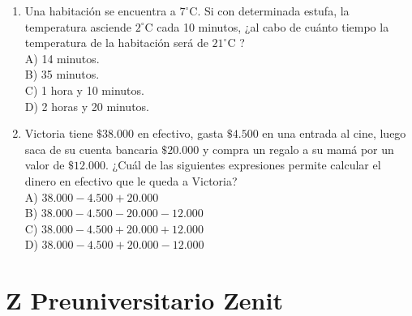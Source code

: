 \documentclass[10pt]{article}
\begin{document}
\begin{enumerate}
B) $10 \mathrm{hr} \cdot 21 \mathrm{~min} \cdot 36 \mathrm{seg}$\\
C) $10 \mathrm{hr} \cdot 21 \mathrm{~min} \cdot 42 \mathrm{seg}$\\
D) $10 \mathrm{hr} \cdot 15 \mathrm{~min} \cdot 54 \mathrm{seg}$
  \item Una habitación se encuentra a $7^{\circ} \mathrm{C}$. Si con determinada estufa, la temperatura asciende $2^{\circ} \mathrm{C}$ cada 10 minutos, ¿al cabo de cuánto tiempo la temperatura de la habitación será de $21^{\circ} \mathrm{C}$ ?\\
A) 14 minutos.\\
B) 35 minutos.\\
C) 1 hora y 10 minutos.\\
D) 2 horas y 20 minutos.
  \item Victoria tiene $\$ 38.000$ en efectivo, gasta $\$ 4.500$ en una entrada al cine, luego saca de su cuenta bancaria $\$ 20.000$ y compra un regalo a su mamá por un valor de $\$ 12.000$. ¿Cuál de las siguientes expresiones permite calcular el dinero en efectivo que le queda a Victoria?\\
A) $38.000-4.500+20.000$\\
B) $38.000-4.500-20.000-12.000$\\
C) $38.000-4.500+20.000+12.000$\\
D) $38.000-4.500+20.000-12.000$
\end{enumerate}

\section*{Z Preuniversitario Zenit}
\end{document}

